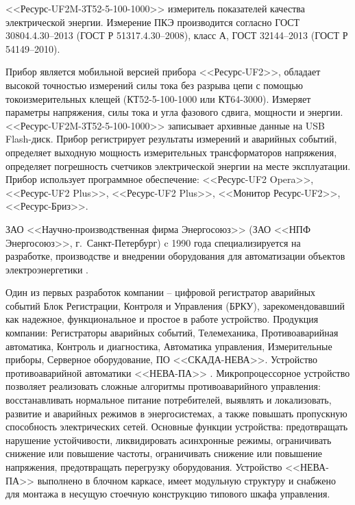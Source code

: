 <<Ресурс-UF2M-3Т52-5-100-1000>> измеритель показателей качества электрической энергии. Измерение ПКЭ производится согласно ГОСТ 30804.4.30--2013 \cite{ГОСТ30804.4.30-2013} (ГОСТ Р 51317.4.30--2008), класс А, ГОСТ 32144--2013 \cite{ГОСТ32144-2013} (ГОСТ Р 54149--2010). 

Прибор является мобильной версией прибора <<Ресурс‑UF2>>, обладает высокой точностью измерений силы тока без разрыва цепи с помощью токоизмерительных клещей (КТ52-5-100-1000 или КТ64-3000). Измеряет параметры напряжения, силы тока и угла фазового сдвига, мощности и энергии. <<Ресурс-UF2M-3Т52-5-100-1000>> записывает архивные данные на USB Flash-диск. Прибор регистрирует результаты измерений и аварийных событий, определяет выходную мощность измерительных трансформаторов напряжения, определяет погрешность счетчиков электрической энергии на месте эксплуатации. Прибор использует программное обеспечение: <<Ресурс-UF2 Opera>>, <<Ресурс-UF2 Plus>>, <<Ресурс-UF2 Plus>>, <<Монитор Ресурс-UF2>>, <<Ресурс-Бриз>>. 

ЗАО <<Научно-производственная фирма Энергосоюз>> (ЗАО <<НПФ Энергосоюз>>, г.~Санкт-Петербург)  c 1990 года специализируется на разработке, производстве и внедрении оборудования для автоматизации объектов электроэнергетики \cite{энергосоюз}.

Один из первых разработок компании -- цифровой регистратор аварийных событий Блок Регистрации, Контроля и Управления (БРКУ), зарекомендовавший как надежное, функциональное и простое в работе устройство. Продукция компании: Регистраторы аварийных событий, Телемеханика, Противоаварийная автоматика, Контроль и диагностика, Автоматика управления, Измерительные приборы, Серверное оборудование, ПО <<СКАДА-НЕВА>>.
Устройство противоаварийной автоматики <<НЕВА-ПА>> \cite{нева-па}. 
Микропроцессорное устройство позволяет реализовать сложные алгоритмы противоаварийного управления: восстанавливать нормальное питание потребителей, выявлять и локализовать, развитие и аварийных режимов в энергосистемах, а также повышать пропускную способность электрических сетей. Основные функции устройства: предотвращать нарушение устойчивости, ликвидировать асинхронные режимы, ограничивать снижение или повышение частоты, ограничивать снижение или повышение напряжения, предотвращать перегрузку оборудования. Устройство <<НЕВА-ПА>> выполнено в блочном каркасе, имеет модульную структуру и снабжено для монтажа в несущую стоечную конструкцию типового шкафа управления.

